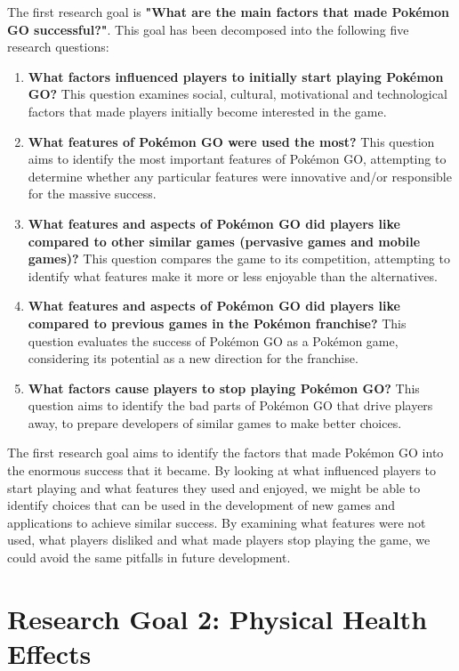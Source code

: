 The first research goal is \textbf{"What are the main factors that made Pokémon GO successful?"}. This goal has been decomposed into the following five research questions:

\begin{enumerate}[label=RQ1.{\arabic*}]
	\item \textbf{What factors influenced players to initially start playing Pokémon GO?}\label{RQ1.1}
		This question examines social, cultural, motivational and technological factors that made players initially become interested in the game.
	\item \textbf{What features of Pokémon GO were used the most?}\label{RQ1.2}
		This question aims to identify the most important features of Pokémon GO, attempting to determine whether any particular features were innovative and/or responsible for the massive success.
	\item \textbf{What features and aspects of Pokémon GO did players like compared to other similar games (pervasive games and mobile games)?}\label{RQ1.3}
		This question compares the game to its competition, attempting to identify what features make it more or less enjoyable than the alternatives.
	\item \textbf{What features and aspects of Pokémon GO did players like compared to previous games in the Pokémon franchise?}\label{RQ1.4}
		This question evaluates the success of Pokémon GO as a Pokémon game, considering its potential as a new direction for the franchise.
	\item \textbf{What factors cause players to stop playing Pokémon GO?}\label{RQ1.5}
		This question aims to identify the bad parts of Pokémon GO that drive players away, to prepare developers of similar games to make better choices.
\end{enumerate}

The first research goal aims to identify the factors that made Pokémon GO into the enormous success that it became. By looking at what influenced players to start playing and what features they used and enjoyed, we might be able to identify choices that can be used in the development of new games and applications to achieve similar success. By examining what features were not used, what players disliked and what made players stop playing the game, we could avoid the same pitfalls in future development.

\section{Research Goal 2: Physical Health Effects}
\label{rg2}

